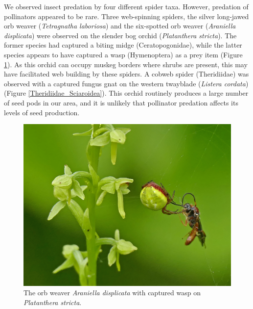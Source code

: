 \begin{multicols}{2}
We observed insect predation by four different spider taxa. However,
predation of pollinators appeared to be rare. Three web-spinning
spiders, the silver long-jawed orb weaver (\emph{Tetragnatha
laboriosa}) and the six-spotted orb weaver (\emph{Araniella
displicata}) were observed on the slender bog orchid (\emph{Platanthera
stricta}). The former species had captured a biting midge
(Ceratopogonidae), while the latter species appears to have captured a wasp (Hymenoptera) %
as a prey item (Figure \ref{Araniella_displicata_Hymenoptera}). As this orchid can occupy muskeg borders where
shrubs are present, this may have facilitated web building by these
spiders. A cobweb spider (Theridiidae) was observed with a captured
fungus gnat on the western twayblade (\emph{Listera cordata}) (Figure
\ref{Theridiidae_Sciaroidea}). This orchid routinely produces a large number of seed pods in our
area, and it is unlikely that pollinator predation affects its levels of
seed production.

\begin{figure}[H]
\begin{center}
\vspace{2mm}
\includegraphics[width=\textwidth]{img/Araniella_displicata_Hymenoptera.jpg}
\caption{The orb weaver \emph{Araniella displicata} with captured wasp on \emph{Platanthera stricta}.}
\label{Araniella_displicata_Hymenoptera}
\end{center}
\end{figure}



\end{multicols}
